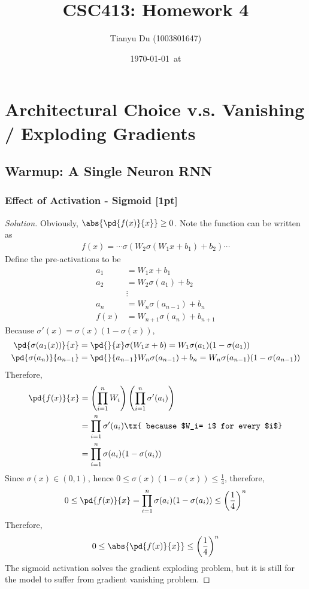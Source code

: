 \documentclass{article}
\title{CSC413: Homework 4}
\date{\today\ at \currenttime}
\author{Tianyu Du (1003801647)}
\begin{document}
	\maketitle
	\section{Architectural Choice v.s. Vanishing / Exploding Gradients}
	\subsection{Warmup: A Single Neuron RNN}
	\subsubsection{Effect of Activation - Sigmoid [1pt]}
	\begin{proof}[Solution]
		Obviously, $\abs{\pd{f(x)}{x}} \geq 0$. Note the function can be written as
		\begin{align}
			f(x) = \cdots \sigma(W_2 \sigma(W_1 x + b_1) + b_2) \cdots
		\end{align}
		Define the pre-activations to be
		\begin{align}
			a_1 &= W_1 x + b_1 \\
			a_2 &= W_2 \sigma(a_1) + b_2 \\
			&\vdots \\
			a_n &= W_n\sigma(a_{n-1}) + b_n \\
			f(x) &= W_{n+1} \sigma(a_n) + b_{n+1}
		\end{align}
		Because $\sigma'(x) = \sigma(x) (1 - \sigma(x))$,
		\begin{align}
			\pd{\sigma(a_1(x))}{x} &= \pd{}{x} \sigma(W_1 x + b) = W_1 \sigma(a_1) (1 - \sigma(a_1)) \\
			\pd{\sigma(a_n)}{a_{n-1}} &= \pd{}{a_{n-1}} W_n \sigma(a_{n-1}) + b_n = W_n \sigma(a_{n-1}) (1 - \sigma(a_{n-1}))
		\end{align}
		Therefore,
		\begin{align}
			\pd{f(x)}{x} &= \left(\prod_{i=1}^n W_i\right) \left( \prod_{i=1}^n \sigma'(a_i) \right) \\
			&= \prod_{i=1}^n \sigma'(a_i) \tx{ because $W_i= 1$ for every $i$} \label{result}\\
			&= \prod_{i=1}^n \sigma(a_i) (1 - \sigma(a_i))
		\end{align}
		Since $\sigma(x) \in (0, 1)$, hence $0 \leq \sigma(x)(1-\sigma(x)) \leq \frac{1}{4}$, therefore,
		\begin{align}
			0 \leq \pd{f(x)}{x} = \prod_{i=1}^n \sigma(a_i) (1 - \sigma(a_i)) \leq \left(\frac{1}{4}\right)^n
		\end{align}
		Therefore,
		\begin{align}
			0 \leq \abs{\pd{f(x)}{x}} \leq \left(\frac{1}{4}\right)^n
		\end{align}
		The sigmoid activation solves the gradient exploding problem, but it is still for the model to suffer from gradient vanishing problem.
	\end{proof}
\end{document}
